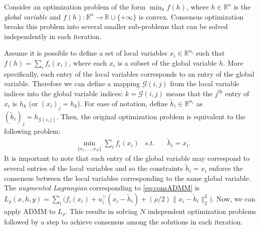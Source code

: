 \documentclass[letterpaper]{article} %
\DeclareMathOperator*{\argmin}{argmin}
\newcommand{\attn}[1]{\textcolor{red}{TODO: #1}}
\newcommand{\norm}[1]{\left\lVert #1 \right\rVert}
\begin{document}
Consider an optimization problem of the form $\min_h f(h)$, where
$h\in\mathbb{R}^n$ is the \textit{global variable} and
$f(h):\mathbb{R}^n \rightarrow \mathbb{R}\cup \{+\infty\}$ is
convex. Consensus optimization breaks this problem
into several smaller sub-problems that can be solved independently in
each iteration.  

Assume it is possible to define a set of local variables
$x_i \in \mathbb{R}^{n_i}$ such that $f(h)=\sum_i f_i(x_i)$, where
each $x_i$ is a subset of the global variable $h$. More specifically,
each entry of the local variables corresponds to an entry of the
global variable. Therefore we can define a mapping $\mathscr{G}(i,j)$
from the local variable indices into the global variable indices:
$k=\mathscr{G}(i,j)$ means that the $j^\text{th}$ entry of $x_i$ is
$h_k$ (or $(x_i)_j=h_k$). For ease of notation, define $\tilde{h}_i
\in \mathbb{R}^{n_i}$ as $(\tilde{h}_i)_j=h_{\mathscr{G}(i,j)}$. Then,
the original optimization problem is equivalent to the following
problem:  
\begin{equation}
\begin{aligned}
&\min_{\{x_1,...,x_N  \}} \sum_i f_i(x_i) &
s.t. &\quad \tilde{h}_i=x_i.
\end{aligned}
\label{eq:consADMM}
\end{equation}
It is important to note that each entry of the global variable may
correspond to several entries of the local variables and so the
constraints $\tilde{h}_i=x_i$ enforce the consensus between the local
variables corresponding to the same global variable.  
The \textit{augmented Lagrangian} corresponding to 
\eqref{eq:consADMM} is $L_\rho(x,h,y)=\sum_i
\big(f_i(x_i)+u_i^\top(x_i-\tilde{h}_i) + (\rho/2) \lVert
x_i-\tilde{h}_i \lVert_2^2 \big)$. Now, we can apply ADMM to $L_\rho$. This results in solving $N$ independent optimization problems followed by a step to achieve consensus among the solutions in each iteration.
\end{document}
